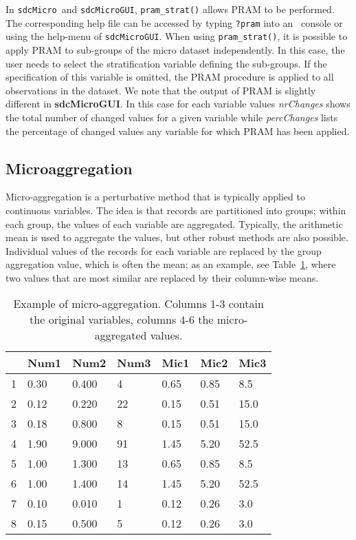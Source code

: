 \documentclass[12pt]{scrartcl}\usepackage[]{graphicx}\usepackage[]{color}
\newcommand{\pkg}[1]{\textbf{#1}}
\newcommand{\sdcMicro}{\texttt{sdcMicro}}
\newcommand{\sdcMicroGUI}{\texttt{sdcMicroGUI}}
\begin{document}
In \sdcMicro \ and \sdcMicroGUI , \lstinline{pram_strat()} allows PRAM to be performed. The corresponding help file can be accessed by typing \lstinline{?pram} into an \R \ console or using the help-menu of \sdcMicroGUI. When using \lstinline{pram_strat()}, it is possible to apply PRAM to sub-groups of the micro dataset independently. In this case, the user needs to select the stratification variable defining the sub-groups. If the specification of this variable is omitted, the PRAM procedure is applied to all observations in the dataset. We note that the output of PRAM is slightly different in \pkg{sdcMicroGUI}. In this case for each variable values \textit{nrChanges} shows the total number of changed values for a given variable while \textit{percChanges} lists the percentage of changed values any variable for which PRAM has been applied.

\subsection{Microaggregation}\label{method:microagg}
Micro-aggregation is a perturbative method that is typically applied to continuous variables. The idea is that records are partitioned into groups; within each group, the values of each variable are aggregated. Typically, the arithmetic mean is used to aggregate the values, but other robust methods are also possible. Individual values of the records for each variable are replaced by the group aggregation value, which is often the mean; as an example, see  Table~\ref{listingMicroaggregation}, where two values that are most similar are replaced by their column-wise means.



\begin{small}
\begin{table}[ht]
\centering
\caption{Example of micro-aggregation. Columns 1-3 contain the original variables, columns 4-6 the micro-aggregated values.} 
\label{listingMicroaggregation}
\begin{tabular}{|l|lll|lll|}
  \hline
 & Num1 & Num2 & Num3 & Mic1 & Mic2 & Mic3 \\ 
  \hline
1 & 0.30 & 0.400 & 4 & 0.65 & 0.85 & 8.5 \\ 
  2 & 0.12 & 0.220 & 22 & 0.15 & 0.51 & 15.0 \\ 
  3 & 0.18 & 0.800 & 8 & 0.15 & 0.51 & 15.0 \\ 
  4 & 1.90 & 9.000 & 91 & 1.45 & 5.20 & 52.5 \\ 
  5 & 1.00 & 1.300 & 13 & 0.65 & 0.85 & 8.5 \\ 
  6 & 1.00 & 1.400 & 14 & 1.45 & 5.20 & 52.5 \\ 
  7 & 0.10 & 0.010 & 1 & 0.12 & 0.26 & 3.0 \\ 
  8 & 0.15 & 0.500 & 5 & 0.12 & 0.26 & 3.0 \\ 
   \hline
\end{tabular}
\end{table}

\end{small}
\end{document}
